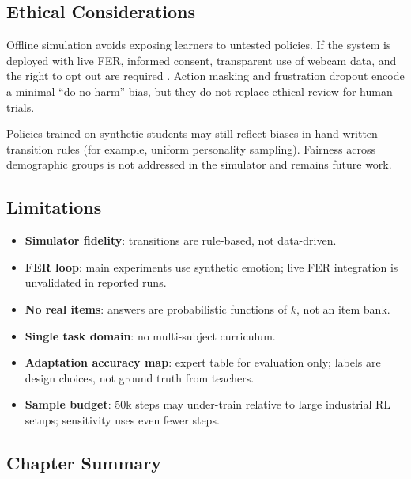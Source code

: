 \subsection{Ethical Considerations}\label{sec:method_rl_ethics}

Offline simulation avoids exposing learners to untested policies. If the system is deployed with live FER, informed consent, transparent use of webcam data, and the right to opt out are required \cite{fernandez-herrero_evaluating_2024,vistorte_integrating_2024,florestiyanto_emotion_2024}. Action masking and frustration dropout encode a minimal ``do no harm'' bias, but they do not replace ethical review for human trials.

Policies trained on synthetic students may still reflect biases in hand-written transition rules (for example, uniform personality sampling). Fairness across demographic groups is not addressed in the simulator and remains future work.

\subsection{Limitations}\label{sec:method_rl_limitations}

\begin{itemize}
    \item \textbf{Simulator fidelity}: transitions are rule-based, not data-driven.
    \item \textbf{FER loop}: main experiments use synthetic emotion; live FER integration is unvalidated in reported runs.
    \item \textbf{No real items}: answers are probabilistic functions of $k$, not an item bank.
    \item \textbf{Single task domain}: no multi-subject curriculum.
    \item \textbf{Adaptation accuracy map}: expert table for evaluation only; labels are design choices, not ground truth from teachers.
    \item \textbf{Sample budget}: $50$k steps may under-train relative to large industrial RL setups; sensitivity uses even fewer steps.
\end{itemize}

\subsection{Chapter Summary}\label{sec:method_rl_summary}

